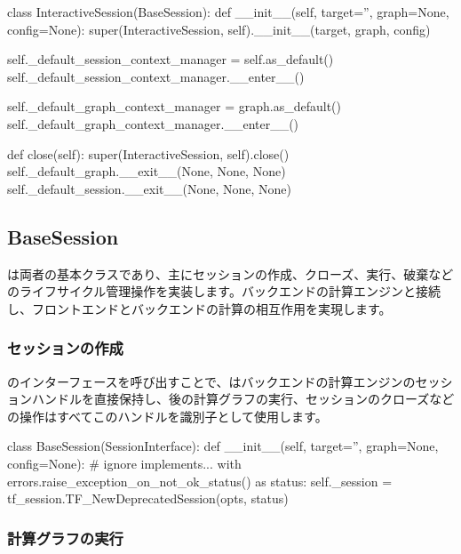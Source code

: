 \begin{content}
\begin{content}
\begin{leftbar}
\begin{python}
class InteractiveSession(BaseSession):
  def __init__(self, target='', graph=None, config=None):
    super(InteractiveSession, self).__init__(target, graph, config)

    self._default_session_context_manager = self.as_default()
    self._default_session_context_manager.__enter__()

    self._default_graph_context_manager = graph.as_default()
    self._default_graph_context_manager.__enter__()

  def close(self):
    super(InteractiveSession, self).close()
    self._default_graph.__exit__(None, None, None)
    self._default_session.__exit__(None, None, None)
\end{python}
\end{leftbar}

\subsection{BaseSession}

は両者の基本クラスであり、主にセッションの作成、クローズ、実行、破棄などのライフサイクル管理操作を実装します。バックエンドの計算エンジンと接続し、フロントエンドとバックエンドの計算の相互作用を実現します。

\subsubsection{セッションの作成}

のインターフェースを呼び出すことで、はバックエンドの計算エンジンのセッションハンドルを直接保持し、後の計算グラフの実行、セッションのクローズなどの操作はすべてこのハンドルを識別子として使用します。

\begin{leftbar}
\begin{python}
class BaseSession(SessionInterface):
  def __init__(self, target='', graph=None, config=None):
    # ignore implements...
    with errors.raise_exception_on_not_ok_status() as status:
      self._session = 
        tf_session.TF_NewDeprecatedSession(opts, status)
\end{python}
\end{leftbar}

\subsubsection{計算グラフの実行}


\end{content}
\end{content}
